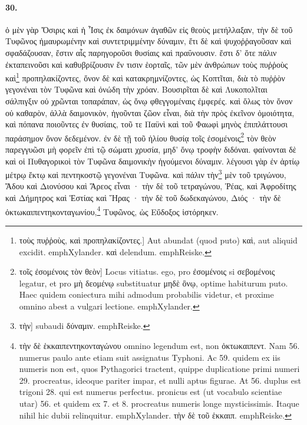 \documentclass[a4paper, 11pt, oneside, polutonikogreek, german]{article}
\begin{document}
\paragraph{30.}
ὁ μὲν γὰρ Ὄσιρις καὶ ἡ Ἶσις ἐκ δαιμόνων ἀγαθῶν εἰς θεοὺς μετήλλαξαν, τὴν δὲ τοῦ Τυφῶνος ἠμαυρωμένην καὶ συντετριμμένην δύναμιν, ἔτι δὲ καὶ ψυχοῤῥαγοῦσαν καὶ σφαδάζουσαν, ἔστιν αἷς παρηγοροῦσι θυσίαις καὶ πραΰνουσιν. ἔστι δ' ὅτε πάλιν ἐκταπεινοῦσι καὶ καθυβρίζουσιν ἔν τισιν ἑορταῖς, τῶν μὲν ἀνθρώπων τοὺς πυῤῥοὺς καὶ\footnote{τοὺς πυῤῥοὺς, καὶ προπηλακίζοντες.] Aut abundat (quod puto) καὶ, aut aliquid excidit. emph{Xylander.} καὶ delendum. emph{Reiske.}} προπηλακίζοντες, ὄνον δὲ καὶ κατακρημνίζοντες, ὡς Κοπτῖται, διὰ τὸ πυῤῥὸν γεγονέναι τὸν Τυφῶνα καὶ ὀνώδη τὴν χρόαν. Βουσιρῖται δὲ καὶ Λυκοπολῖται σάλπιγξιν οὐ χρῶνται τοπαράπαν, ὡς ὄνῳ φθεγγομέναις ἐμφερές. καὶ ὅλως τὸν ὄνον οὐ καθαρὸν, ἀλλὰ δαιμονικὸν, ἡγοῦνται ζῶον εἶναι, διὰ τὴν πρὸς ἐκεῖνον ὁμοιότητα, καὶ πόπανα ποιοῦντες ἐν θυσίαις, τοῦ τε Παϋνὶ καὶ τοῦ Φαωφὶ μηνὸς ἐπιπλάττουσι παράσημον ὄνον δεδεμένον. ἐν δὲ τῇ τοῦ ἡλίου θυσίᾳ τοῖς ἐσομένοις\footnote{τοῖς ἐσομένοις τὸν θεὸν] Locus vitiatus. ego, pro ἐσομένοις si σεβομένοις legatur, et pro μὴ δεομένῳ substituatur μηδὲ ὂνῳ, optime habiturum puto. Haec quidem coniectura mihi admodum probabilis videtur, et proxime omnino abest a vulgari lectione. emph{Xylander.}} τὸν θεὸν παρεγγυῶσι μὴ φορεῖν ἐπὶ τῷ σώματι χρυσία, μηδ' ὄνῳ τροφὴν διδόναι. φαίνονται δὲ καὶ οἱ Πυθαγορικοὶ τὸν Τυφῶνα δαιμονικὴν ἡγούμενοι δύναμιν. λέγουσι γὰρ ἐν ἀρτίῳ μέτρῳ ἕκτῳ καὶ πεντηκοστῷ γεγονέναι Τυφῶνα. καὶ πάλιν τὴν\footnote{τὴν] subaudi δύναμιν. emph{Reiske.}} μὲν τοῦ τριγώνου, Ἅδου καὶ Διονύσου καὶ Ἄρεος εἶναι · τὴν δὲ τοῦ τετραγώνου, Ῥέας, καὶ Ἀφροδίτης καὶ Δήμητρος καὶ Ἑστίας καὶ Ἥρας · τὴν δὲ τοῦ δωδεκαγώνου, Διός · τὴν δὲ ὀκτωκαιπεντηκονταγωνίου,\footnote{τὴν δὲ ἑκκαιπεντηκονταγώνου omnino legendum est, non ὀκτωκαιπεντ. Nam 56. numerus paulo ante etiam suit assignatus Typhoni. Ac 59. quidem ex iis numeris non est, quos Pythagorici tractent, quippe duplicatione primi numeri 29. procreatus, ideoque pariter impar, et nulli aptus figurae. At 56. duplus est trigoni 28. qui est numerus perfectus. pronicus est (ut vocabulo scientiae utar) 56. et quidem ex 7. et 8. procreatus numeris longe mysticissimis. Itaque nihil hic dubii relinquitur. emph{Xylander.} τὴν δὲ τοῦ ἑκκαιπ. emph{Reiske.}} Τυφῶνος, ὡς Εὔδοξος ἱστόρηκεν.
\end{document}
